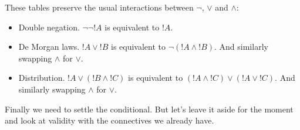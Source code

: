 \documentclass[../../../include/open-logic-section]{subfiles}
\begin{document}
\begin{center}
%
\end{center} 

\begin{explain}
These tables preserve the usual interactions between $\lnot$, $\lor$ and $\land$: 

\begin{itemize}
	\item Double negation. $\lnot \lnot !A$ is equivalent to $!A$.
	\item De Morgan laws. $!A \lor !B$ is equivalent to $\lnot (!A \land !B)$. And similarly swapping $\land$ for $\lor$.
	\item Distribution. $!A \lor (!B \land !C)$ is equivalent to $(!A \land !C) \lor (!A \lor !C)$. And similarly swapping $\land$ for $\lor$.
\end{itemize}

\end{explain}

Finally we need to settle the conditional. But let's leave it aside for the moment and look at validity with the connectives we already have. 
\end{document}
